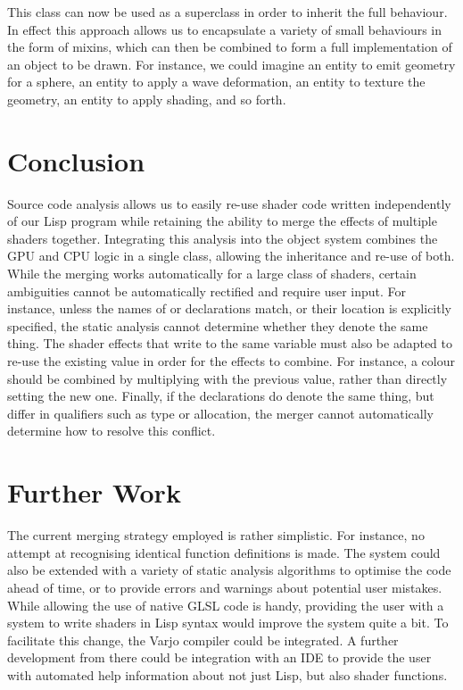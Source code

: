 \documentclass{sig-alternate}
\begin{document}
This  class can now be used as a superclass in order to inherit the full behaviour. In effect this approach allows us to encapsulate a variety of small behaviours in the form of mixins, which can then be combined to form a full implementation of an object to be drawn. For instance, we could imagine an entity to emit geometry for a sphere, an entity to apply a wave deformation, an entity to texture the geometry, an entity to apply shading, and so forth.

\section{Conclusion}\label{section:5}
Source code analysis allows us to easily re-use shader code written independently of our Lisp program while retaining the ability to merge the effects of multiple shaders together. Integrating this analysis into the object system combines the GPU and CPU logic in a single class, allowing the inheritance and re-use of both. \\

While the merging works automatically for a large class of shaders, certain ambiguities cannot be automatically rectified and require user input. For instance, unless the names of  or  declarations match, or their location is explicitly specified, the static analysis cannot determine whether they denote the same thing. The shader effects that write to the same  variable must also be adapted to re-use the existing value in order for the effects to combine. For instance, a colour should be combined by multiplying with the previous value, rather than directly setting the new one. Finally, if the declarations do denote the same thing, but differ in qualifiers such as type or allocation, the merger cannot automatically determine how to resolve this conflict.

\section{Further Work}\label{section:6}
The current merging strategy employed is rather simplistic. For instance, no attempt at recognising identical function definitions is made. The system could also be extended with a variety of static analysis algorithms to optimise the code ahead of time, or to provide errors and warnings about potential user mistakes. \\

While allowing the use of native GLSL code is handy, providing the user with a system to write shaders in Lisp syntax would improve the system quite a bit. To facilitate this change, the Varjo\cite{varjo} compiler could be integrated. A further development from there could be integration with an IDE to provide the user with automated help information about not just Lisp, but also shader functions.
\end{document}
